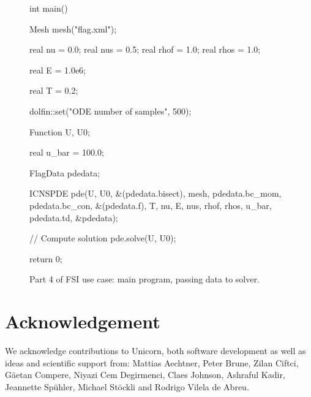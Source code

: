 \begin{figure}[!h]
\begin{c++}
int main()
{
  Mesh mesh("flag.xml");

  real nu = 0.0;
  real nus = 0.5;
  real rhof = 1.0;
  real rhos = 1.0;

  real E = 1.0e6;

  real T = 0.2;

  dolfin::set("ODE number of samples", 500);

  Function U, U0;

  real u_bar = 100.0;

  FlagData pdedata;

  ICNSPDE pde(U, U0, &(pdedata.bisect), mesh,
	      pdedata.bc_mom, pdedata.bc_con,
	      &(pdedata.f), T, nu, E, nus, rhof, rhos,
	      u_bar, pdedata.td, &pdedata);

  // Compute solution
  pde.solve(U, U0);

  return 0;
}
\end{c++}
\caption{Part 4 of FSI use case: main program, passing data to solver.}
\end{figure}

\section{Acknowledgement}

We acknowledge contributions to Unicorn, both software development as
well as ideas and scientific support from: Mattias Aechtner, Peter
Brune, Zilan Ciftci, G\"aetan Compere, Niyazi Cem Degirmenci, Claes
Johnson, Ashraful Kadir, Jeannette Sp\"uhler, Michael St\"ockli and
Rodrigo Vilela de Abreu.


